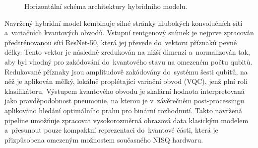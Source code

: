 \documentclass[12pt, a4paper]{report}
\begin{document}
\begin{figure}[ht]
    \centering
    \caption{Horizontální schéma architektury hybridního modelu.}
    \label{fig:architektura}
\end{figure}

Navržený hybridní model kombinuje silné stránky hlubokých konvolučních sítí a~variačních kvantových obvodů. Vstupní rentgenový snímek je nejprve zpracován předtrénovanou sítí ResNet-50, která jej převede do~vektoru příznaků pevné délky. Tento vektor je následně zredukován na nižší dimenzi a~normalizován tak, aby byl vhodný pro zakódování do~kvantového stavu na omezeném počtu qubitů. Redukované příznaky jsou amplitudově zakódovány do~systému šesti qubitů, na něž je aplikován mělký, lokálně proplétající variační obvod (VQC), jenž plní roli klasifikátoru. Výstupem kvantového obvodu je skalární hodnota interpretovaná jako pravděpodobnost pneumonie, na kterou je v~závěrečném post-processingu aplikováno hledání optimálního prahu pro binární rozhodnutí. Takto navržená pipeline umožňuje zpracovat vysokorozměrná obrazová data klasickým modelem a~přesunout pouze kompaktní reprezentaci do~kvantové části, která je přizpůsobena omezeným možnostem současného NISQ hardwaru.
\end{document}
